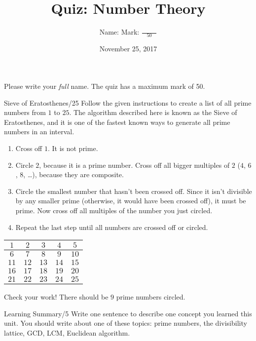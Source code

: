 \documentclass[12pt,letterpaper]{article}
\title{Quiz: Number Theory}
\author{Name: \underline{\hspace{5cm}} Mark: $\displaystyle \frac{\hspace{3em}}{50}$}
\date{November 25, 2017}
\begin{document}
\maketitle

Please write your \emph{full} name. The quiz has a maximum mark of 50.

\thispagestyle{empty}

\begin{problem}{Sieve of Eratosthenes\hfill/25}
 Follow the given instructions to create a list of all prime numbers from \(1\) to \(25\).
 The algorithm described here is known as the Sieve of Eratosthenes, and it is one of the
 fastest known ways to generate all prime numbers in an interval.

 \begin{enumerate}
  \item Cross off $1$. It is not prime.
  \item Circle $2$, because it is a prime number. Cross off all bigger multiples
  of $2$ ($4$, $6$, $8$, \dots), because they are composite.
  \item Circle the smallest number that hasn't been crossed off. Since it isn't
  divisible by any smaller prime (otherwise, it would have been crossed off),
  it must be prime. Now cross off all multiples of the number you just circled.
  \item Repeat the last step until all numbers are crossed off or circled.
 \end{enumerate}

 \begin{center}
  \def\arraystretch{1.7}
  \begin{tabular}{|c|c|c|c|c|}
   \hline
   $1$ & $2$ & $3$ & $4$ & $5$ \\
   \hline
   $6$ & $7$ & $8$ & $9$ & $10$ \\
   \hline
   $11$ & $12$ & $13$ & $14$ & $15$ \\
   \hline
   $16$ & $17$ & $18$ & $19$ & $20$ \\
   \hline
   $21$ & $22$ & $23$ & $24$ & $25$ \\
   \hline
  \end{tabular}
 \end{center}

 Check your work! There should be $9$ prime numbers circled.
\end{problem}

\begin{problem}{Learning Summary\hfill/5}
  Write one sentence to describe one concept you learned this unit. You should write about
  one of these topics: prime numbers, the divisibility lattice, GCD, LCM, Euclidean
  algorithm.
\end{problem}
\end{document}
